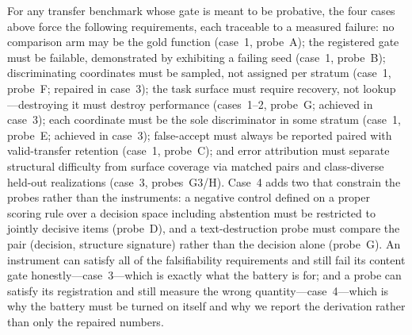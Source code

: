 For any transfer benchmark whose gate is meant to be probative, the four cases above force the following requirements, each traceable to a measured failure: no comparison arm may be the gold function (case~1, probe~A); the registered gate must be failable, demonstrated by exhibiting a failing seed (case~1, probe~B); discriminating coordinates must be sampled, not assigned per stratum (case~1, probe~F; repaired in case~3); the task surface must require recovery, not lookup---destroying it must destroy performance (cases~1--2, probe~G; achieved in case~3); each coordinate must be the sole discriminator in some stratum (case~1, probe~E; achieved in case~3); false-accept must always be reported paired with valid-transfer retention (case~1, probe~C); and error attribution must separate structural difficulty from surface coverage via matched pairs and class-diverse held-out realizations (case~3, probes~G3/H). Case~4 adds two that constrain the probes rather than the instruments: a negative control defined on a proper scoring rule over a decision space including abstention must be restricted to jointly decisive items (probe~D), and a text-destruction probe must compare the pair (decision, structure signature) rather than the decision alone (probe~G). An instrument can satisfy all of the falsifiability requirements and still fail its content gate honestly---case~3---which is exactly what the battery is for; and a probe can satisfy its registration and still measure the wrong quantity---case~4---which is why the battery must be turned on itself and why we report the derivation rather than only the repaired numbers.
